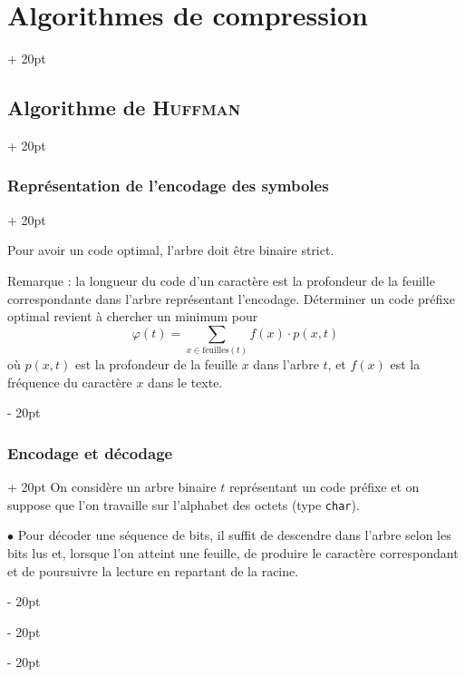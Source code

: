 \documentclass[a4paper, 12pt, twoside]{article}
\newcommand{\ind}[1][20pt]{\advance\leftskip + #1}
\newcommand{\deind}[1][20pt]{\advance\leftskip - #1}
\newenvironment{indt}[2][20pt]{#2 \par \ind[#1]}{\par \deind} %
\begin{document}
\begin{indt}{\section{Algorithmes de compression}}
\begin{indt}{\subsection{Algorithme de \textsc{Huffman}}}
\begin{indt}{\subsubsection{Représentation de l'encodage des symboles}}
\begin{center}
                \end{center}

                Pour avoir un code optimal, l'arbre doit être binaire strict.

                \vspace{12pt}
                
                Remarque : la longueur du code d'un caractère est la profondeur de la feuille correspondante dans l'arbre représentant l'encodage. Déterminer un code préfixe optimal revient à chercher un minimum pour
                \[
                    \varphi(t) = \sum_{x \in \mathrm{feuilles}(t)} f(x) \cdot p(x, t)
                \]
                où $p(x, t)$ est la profondeur de la feuille $x$ dans l'arbre $t$, et $f(x)$ est la fréquence du caractère $x$ dans le texte.
            \end{indt}

            \vspace{12pt}
            
            \begin{indt}{\subsubsection{Encodage et décodage}}
                On considère un arbre binaire $t$ représentant un code préfixe et on suppose que l'on travaille sur l'alphabet des octets (type \texttt{char}).

                \vspace{6pt}
                
                $\bullet$ Pour décoder une séquence de bits, il suffit de descendre dans l'arbre selon les bits lus et, lorsque l'on atteint une feuille, de produire le caractère correspondant et de poursuivre la lecture en repartant de la racine.


\end{indt}
\end{indt}
\end{indt}
\end{document}
